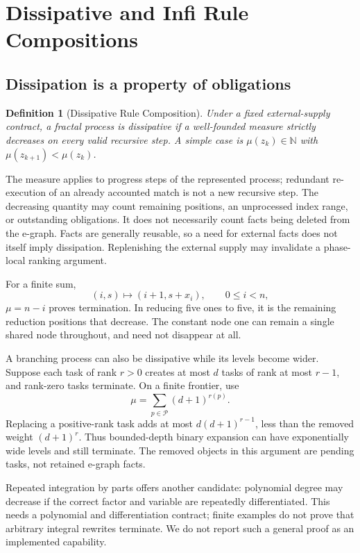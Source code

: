 \documentclass[11pt,a4paper]{article}
\newtheorem{definition}{Definition}
\begin{document}
\section{Dissipative and Infi Rule Compositions}
\subsection{Dissipation is a property of obligations}
\begin{definition}[Dissipative Rule Composition]
Under a fixed external-supply contract, a fractal process is dissipative if a
well-founded measure strictly decreases on every valid recursive step. A simple
case is $\mu(z_k)\in\mathbb N$ with
$\mu(z_{k+1})<\mu(z_k)$.
\end{definition}

The measure applies to progress steps of the represented process; redundant
re-execution of an already accounted match is not a new recursive step.
The decreasing quantity may count remaining positions, an unprocessed index
range, or outstanding obligations. It does not necessarily count facts being
deleted from the e-graph. Facts are generally reusable, so a need for external
facts does not itself imply dissipation. Replenishing the external supply may
invalidate a phase-local ranking argument.

For a finite sum,
\begin{equation}
 (i,s)\mapsto(i+1,s+x_i),\qquad 0\le i<n,
\end{equation}
$\mu=n-i$ proves termination. In reducing five ones to five, it is the remaining
reduction positions that decrease. The constant node one can remain a single
shared node throughout, and need not disappear at all.

A branching process can also be dissipative while its levels become wider.
Suppose each task of rank $r>0$ creates at most $d$ tasks of rank at most $r-1$,
and rank-zero tasks terminate. On a finite frontier, use
\begin{equation}
 \mu=\sum_{p\in\mathcal P}(d+1)^{r(p)}.
\end{equation}
Replacing a positive-rank task adds at most $d(d+1)^{r-1}$, less than the removed
weight $(d+1)^r$. Thus bounded-depth binary expansion can have exponentially wide
levels and still terminate. The removed objects in this argument are pending
tasks, not retained e-graph facts.

Repeated integration by parts offers another candidate: polynomial degree may
decrease if the correct factor and variable are repeatedly differentiated.
This needs a polynomial and differentiation contract; finite examples do not
prove that arbitrary integral rewrites terminate. We do not report such a general
proof as an implemented capability.
\end{document}
